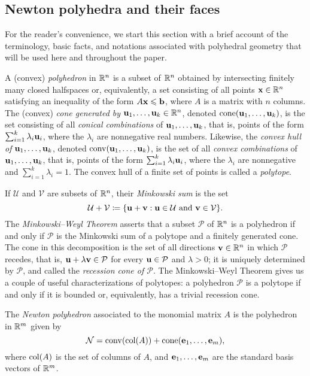 \documentclass{amsart}
\begin{document}
\subsection{Newton polyhedra and their faces}

For the reader's convenience, we start this section with a brief account of the terminology, basic facts, and notations associated with polyhedral geometry that will be used here and throughout the paper.

A (convex) \emph{polyhedron} in $\mathbb{R}^n$ is a subset of $\mathbb{R}^n$ obtained by intersecting finitely many closed halfspaces or, equivalently, a set consisting of all points $\mathbf{x}\in \mathbb{R}^n$ satisfying an inequality of the form $A\mathbf{x}\leqslant \mathbf{b}$, where $A$ is a matrix with $n$ columns.
The (convex) \emph{cone generated by $\mathbf{u}_1,\ldots,\mathbf{u}_k \in \mathbb{R}^n$}, denoted $\operatorname{cone}(\mathbf{u}_1,\ldots,\mathbf{u}_k)$, is the set consisting of all \emph{conical combinations} of $\mathbf{u}_1, \ldots, \mathbf{u}_k$, that is, points of the form $\sum_{i=1}^k \lambda_i \mathbf{u}_i$, where the $\lambda_i$ are nonnegative real numbers.
Likewise, the \emph{convex hull of $\mathbf{u}_1,\ldots,\mathbf{u}_k$}, denoted $\operatorname{conv}(\mathbf{u}_1,\ldots,\mathbf{u}_k)$, is the set of all \emph{convex combinations} of $\mathbf{u}_1, \ldots, \mathbf{u}_k$, that is, points of the form $\sum_{i=1}^k \lambda_i \mathbf{u}_i$, where the $\lambda_i$ are nonnegative and $\sum_{i=1}^k \lambda_i = 1$.
The convex hull of a finite set of points is called a \emph{polytope}.

If $\mathcal{U}$ and $\mathcal{V}$ are subsets of $\mathbb{R}^n$, their \emph{Minkowski sum} is the set
\[\mathcal{U}+\mathcal{V} \coloneqq \{\mathbf{u}+\mathbf{v}: \mathbf{u}\in \mathcal{U}\text{ and }\mathbf{v}\in \mathcal{V}\}.\]
The \emph{Minkowski--Weyl Theorem} asserts that a subset $\mathcal{P}$ of $\mathbb{R}^n$ is a polyhedron if and only if $\mathcal{P}$ is the Minkowski sum of a polytope and a finitely generated cone.
The cone in this decomposition is the set of all directions $\mathbf{v} \in \mathbb{R}^n$ in which $\mathcal{P}$ recedes, that is, $\mathbf{u} + \lambda \mathbf{v} \in \mathcal{P}$ for every $\mathbf{u} \in \mathcal{P}$ and $\lambda > 0$; it is uniquely determined by $\mathcal{P}$, and called the \emph{recession cone of $\mathcal{P}$}.
The Minkowski--Weyl Theorem gives us a couple of useful characterizations of polytopes: a polyhedron $\mathcal{P}$ is a polytope if and only if it is bounded or, equivalently, has a trivial recession cone.

\begin{definition}
The \emph{Newton polyhedron} associated to the monomial matrix $A$ is the polyhedron in $\mathbb{R}^m$ given by
\[ \mathcal{N} = \operatorname{conv}( \operatorname{col}(A) ) + \operatorname{cone}( \mathbf{e}_1, \ldots, \mathbf{e}_m), \]
where $\operatorname{col}(A)$ is the set of columns of $A$, and $\mathbf{e}_1, \ldots, \mathbf{e}_m$ are the standard basis vectors of $\mathbb{R}^m$.
\end{definition}
\end{document}
